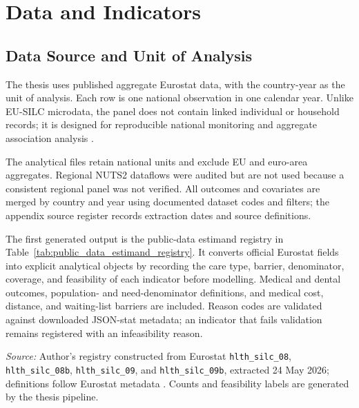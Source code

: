 \chapter{Data and Indicators}
\label{ch:data_indicators}

\section{Data Source and Unit of Analysis}

The thesis uses published aggregate Eurostat data, with the country-year as the unit of analysis. Each row is one national observation in one calendar year. Unlike EU-SILC microdata, the panel does not contain linked individual or household records; it is designed for reproducible national monitoring and aggregate association analysis \citep{eurostat_eusilc_methodology,eurostat_silc_information_data}.

The analytical files retain national units and exclude EU and euro-area aggregates. Regional NUTS2 dataflows were audited but are not used because a consistent regional panel was not verified. All outcomes and covariates are merged by country and year using documented dataset codes and filters; the appendix source register records extraction dates and source definitions.

The first generated output is the public-data estimand registry in Table~\ref{tab:public_data_estimand_registry}. It converts official Eurostat fields into explicit analytical objects by recording the care type, barrier, denominator, coverage, and feasibility of each indicator before modelling. Medical and dental outcomes, population- and need-denominator definitions, and medical cost, distance, and waiting-list barriers are included. Reason codes are validated against downloaded JSON-stat metadata; an indicator that fails validation remains registered with an infeasibility reason.

\begin{table}[H]
\centering
\scriptsize
\caption{Public-data estimand registry for Eurostat unmet-care indicators. The registry defines each outcome before modelling by dataset, care type, denominator, barrier, coverage, and feasibility.}
\label{tab:public_data_estimand_registry}

\vspace{0.25em}

\begin{minipage}{0.96\textwidth}
\scriptsize \textit{Source:} Author's registry constructed from Eurostat \texttt{hlth\_silc\_08}, \texttt{hlth\_silc\_08b}, \texttt{hlth\_silc\_09}, and \texttt{hlth\_silc\_09b}, extracted 24 May 2026; definitions follow Eurostat metadata \citep{eurostat_health_variables_metadata,eurostat_unmet_needs_statistics}. Counts and feasibility labels are generated by the thesis pipeline.
\end{minipage}
\end{table}

